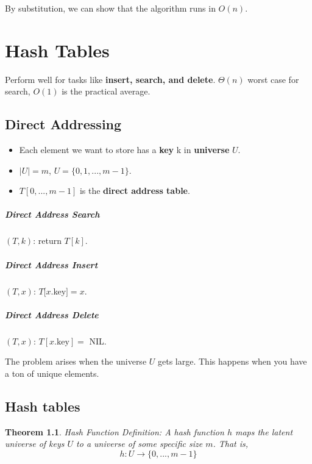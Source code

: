 \documentclass[a4paper,12pt]{report}
\newtheorem{theorem}{Theorem}
\begin{document}
By substitution, we can show that the algorithm runs in $O(n)$.











\chapter{Hash Tables}

Perform well for tasks like \textbf{insert, search, and delete}. $\Theta(n)$ worst case for search, $O(1)$ is the practical average. 

\section{Direct Addressing}

\begin{itemize}
\item Each element we want to store has a \textbf{key} k in \textbf{universe} $U$.
\item $|U| = m$, $U = \{0, 1, ..., m-1\}$.
\item $T[0,...,m-1]$ is the \textbf{direct address table}.
\end{itemize}

\paragraph{Direct Address Search}$(T,k)$: return $T[k]$. 

\paragraph{Direct Address Insert}$(T,x)$: $T[x$.key$]=x$.

\paragraph{Direct Address Delete}$(T, x)$: $T[x.\text{key}] =$ NIL.

The problem arises when the universe $U$ gets large. This happens when you have a ton of unique elements. 


\section{Hash tables}

\begin{theorem}{Hash Function Definition:}
A hash function $h$ maps the latent universe of keys $U$ to a universe of some specific size $m$. That is,
\begin{equation}
h:U\to \{0,..., m-1\}
\end{equation}
\end{theorem}
\end{document}
